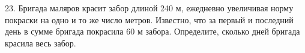 23. Бригада маляров красит забор длиной 240 м, ежедневно увеличивая норму покраски на одно и то же число метров. Известно, что за первый и последний день в сумме бригада покрасила 60 м забора. Определите, сколько дней бригада красила весь забор.\\
